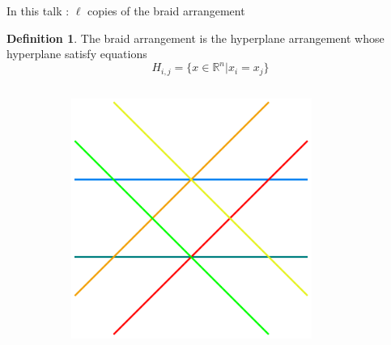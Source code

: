\documentclass[slidetop,11pt %
]{beamer}
\theoremstyle{definition}
\newtheorem{defi}[theorem]{Definition}
\begin{document}
\begin{frame}{In this talk : $\ell$ copies of the braid arrangement}
\begin{defi}
The \textcolor{newSec}{braid arrangement} is the hyperplane arrangement whose hyperplane satisfy equations
\begin{equation*}
H_{i,j}=\{x \in \mathbb{R}^n| x_i=x_j\}
\end{equation*}
\end{defi}

\begin{columns}
\begin{column}{0.5\textwidth}
\centering
{}
\end{column}
\begin{column}{0.5\textwidth}
\includegraphics[width=0.7\textwidth]{arr.pdf}
\end{column}
\end{columns}


\end{frame}
\end{document}
